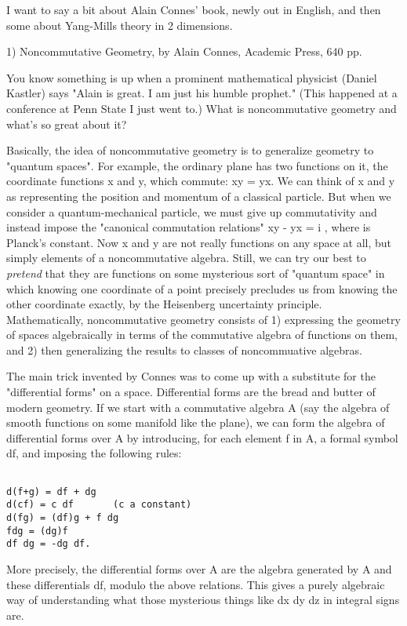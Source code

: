 

I want to say a bit about Alain Connes' book, newly out in English, and
then some about Yang-Mills theory in 2 dimensions.

1) Noncommutative Geometry, by Alain Connes, Academic Press, 640 pp.

You know something is up when a prominent mathematical physicist (Daniel
Kastler) says "Alain is great.  I am just his humble prophet."  (This
happened at a conference at Penn State I just went to.)  What is
noncommutative geometry and what's so great about it?

Basically, the idea of noncommutative geometry is to generalize geometry
to "quantum spaces".  For example, the ordinary plane has two functions
on it, the coordinate functions x and y, which commute: xy = yx.  We can
think of x and y as representing the position and momentum of a
classical particle.  But when we consider a quantum-mechanical particle,
we must give up commutativity and instead impose the "canonical
commutation relations" xy - yx = i \hbar , where \hbar  is Planck's
constant.  Now x and y are not really functions on any space at all, but
simply elements of a noncommutative algebra.  Still, we can try our best
to \emph{pretend} that they are functions on some mysterious sort of
"quantum space" in which knowing one coordinate of a point
precisely precludes us from knowing the other coordinate exactly, by the
Heisenberg uncertainty principle.  Mathematically, noncommutative
geometry consists of 1) expressing the geometry of spaces algebraically
in terms of the commutative algebra of functions on them, and 2) then
generalizing the results to classes of noncommuative algebras.

The main trick invented by Connes was to come up with a substitute for
the "differential forms" on a space.  Differential forms are the bread
and butter of modern geometry.  If we start with a commutative algebra A
(say the algebra of smooth functions on some manifold like the plane),
we can form the algebra of differential forms over A by introducing, for
each element f in A, a formal symbol df, and imposing the following
rules:


\begin{verbatim}

d(f+g) = df + dg
d(cf) = c df       (c a constant)
d(fg) = (df)g + f dg
fdg = (dg)f
df dg = -dg df.
\end{verbatim}
    

More precisely, the differential forms over A are the algebra generated
by A and these differentials df, modulo the above relations.  This gives
a purely algebraic way of understanding what those mysterious things
like dx dy dz in integral signs are.  

